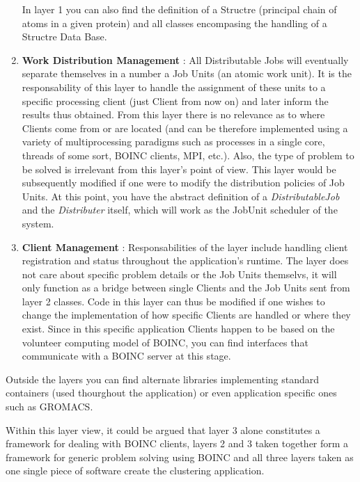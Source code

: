 \documentclass[a4paper]{article}
\begin{document}
\begin{enumerate}
\begin{description}
\end{description}
In layer 1 you can also find the definition of a Structre (principal chain of atoms in a given protein) and all classes encompasing the handling of a Structre Data Base.

 \item \textbf{Work Distribution Management} : All Distributable Jobs will eventually separate themselves in a number a Job Units (an atomic work unit). It is the responsability of this layer to handle the assignment of these units to a specific processing client (just Client from now on) and later inform the results thus obtained. From this layer there is no relevance as to where Clients come from or are located (and can be therefore implemented using a variety of multiprocessing paradigms such as processes in a single core, threads of some sort, BOINC clients, MPI, etc.). Also, the type of problem to be solved is irrelevant from this layer's point of view. This layer would be subsequently modified if one were to modify the distribution policies of Job Units. At this point, you have the abstract definition of a \textit{DistributableJob} and the \textit{Distributer} itself, which will work as the JobUnit scheduler of the system.

 \item \textbf{Client Management} : Responsabilities of the layer include handling client registration and status throughout the application's runtime. The layer does not care about specific problem details or the Job Units themselvs, it will only function as a bridge between single Clients and the Job Units sent from layer 2 classes. Code in this layer can thus be modified if one wishes to change the implementation of how specific Clients are handled or where they exist. Since in this specific application Clients happen to be based on the volunteer computing model of BOINC, you can find interfaces that communicate with a BOINC server at this stage.
\end{enumerate}

Outside the layers you can find alternate libraries implementing standard containers (used thourghout the application) or even application specific ones such as GROMACS.

Within this layer view, it could be argued that layer 3 alone constitutes a framework for dealing with BOINC clients, layers 2 and 3 taken together form a framework for generic problem solving using BOINC and all three layers taken as one single piece of software create the clustering application.
\end{document}
